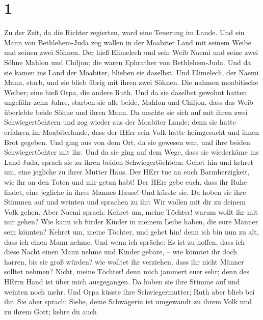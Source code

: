 \hypertarget{section}{%
\section{1}\label{section}}

 Zu der Zeit, da die Richter regierten, ward eine Teuerung
im Lande. Und ein Mann von Bethlehem-Juda zog wallen in der Moabiter
Land mit seinem Weibe und seinen zwei Söhnen.  Der hieß
Elimelech und sein Weib Naemi und seine zwei Söhne Mahlon und Chiljon;
die waren Ephrather von Bethlehem-Juda. Und da sie kamen ins Land der
Moabiter, blieben sie daselbst.  Und Elimelech, der Naemi
Mann, starb, und sie blieb übrig mit ihren zwei Söhnen.  Die
nahmen moabitische Weiber; eine hieß Orpa, die andere Ruth. Und da sie
daselbst gewohnt hatten ungefähr zehn Jahre,  starben sie
alle beide, Mahlon und Chiljon, dass das Weib überlebte beide Söhne und
ihren Mann.  Da machte sie sich auf mit ihren zwei
Schwiegertöchtern und zog wieder aus der Moabiter Lande; denn sie hatte
erfahren im Moabiterlande, dass der HErr sein Volk hatte heimgesucht und
ihnen Brot gegeben.  Und ging aus von dem Ort, da sie
gewesen war, und ihre beiden Schwiegertöchter mit ihr. Und da sie ging
auf dem Wege, dass sie wiederkäme ins Land Juda,  sprach sie
zu ihren beiden Schwiegertöchtern: Gehet hin und kehret um, eine
jegliche zu ihrer Mutter Haus. Der HErr tue an euch Barmherzigkeit, wie
ihr an den Toten und mir getan habt!  Der HErr gebe euch,
dass ihr Ruhe findet, eine jegliche in ihres Mannes Hause! Und küsste
sie. Da hoben sie ihre Stimmen auf und weinten  und
sprachen zu ihr: Wir wollen mit dir zu deinem Volk gehen. 
Aber Naemi sprach: Kehret um, meine Töchter! warum wollt ihr mit mir
gehen? Wie kann ich fürder Kinder in meinem Leibe haben, die eure Männer
sein könnten?  Kehret um, meine Töchter, und gehet hin!
denn ich bin nun zu alt, dass ich einen Mann nehme. Und wenn ich
spräche: Es ist zu hoffen, dass ich diese Nacht einen Mann nehme und
Kinder gebäre, --  wie könntet ihr doch harren, bis sie
groß würden? wie wolltet ihr verziehen, dass ihr nicht Männer solltet
nehmen? Nicht, meine Töchter! denn mich jammert euer sehr; denn des
HErrn Hand ist über mich ausgegangen.  Da hoben sie ihre
Stimme auf und weinten noch mehr. Und Orpa küsste ihre Schwiegermutter;
Ruth aber blieb bei ihr.  Sie aber sprach: Siehe, deine
Schwägerin ist umgewandt zu ihrem Volk und zu ihrem Gott; kehre du auch
